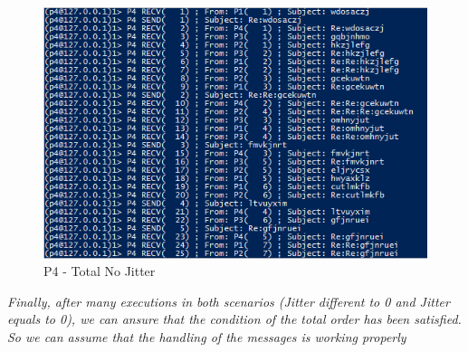 \begin{figure}[h!]
\centering
\includegraphics[scale=0.9]{sections/screenshots/totalP4_noJitter.PNG}
\caption{P4 - Total No Jitter}
\label{fig:p4_Total_noJitter}
\end{figure}

\clearpage
\textit{Finally, after many executions in both scenarios (Jitter different to 0 and Jitter equals to 0), we can ansure that the condition of the total order has been satisfied. So we can assume that  the handling of the messages is working properly}